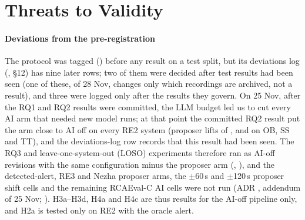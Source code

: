 \section{Threats to Validity}
\label{sec:threats}

\paragraph{Deviations from the pre-registration}
The protocol was tagged () before any \sys result on a test split, but its deviations log (\allowbreak{}, \S12) has nine later rows; two of them were decided after test results had been seen (one of these, of 28 Nov, changes only which recordings are archived, not a result), and three were logged only after the results they govern.
On 25 Nov, after the RQ1 and RQ2 results were committed, the LLM budget led us to cut every AI arm that needed new model runs; at that point the committed RQ2 result put the  arm close to AI off on every RE2 system (proposer lifts of ,  and  on OB, SS and TT), and the deviations-log row records that this result had been seen.
The RQ3 and leave-one-system-out (LOSO) experiments therefore ran as AI-off revisions with the same configuration minus the proposer arm (\allowbreak{}, \allowbreak{}), and the detected-alert, RE3 and Nezha proposer arms, the $\pm$60\,s and $\pm$120\,s proposer shift cells and the remaining RCAEval-C AI cells were not run (ADR \allowbreak{}, addendum of 25 Nov; \allowbreak{}).
H3a--H3d, H4a and H4c are thus results for the AI-off pipeline only, and H2a is tested only on RE2 with the oracle alert.
